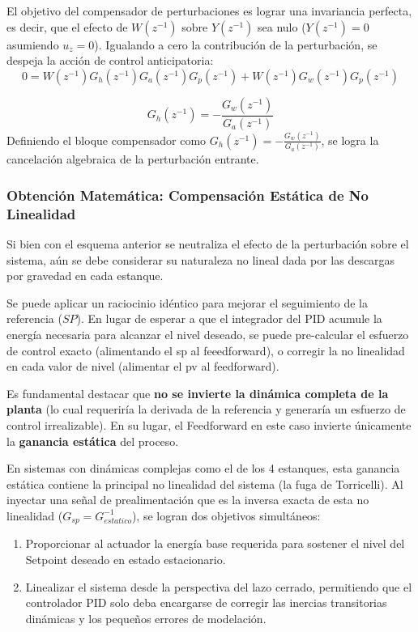 \clearpage


El objetivo del compensador de perturbaciones es lograr una invariancia perfecta, es decir, que el efecto de $W(z^{-1})$ sobre $Y(z^{-1})$ sea nulo ($Y(z^{-1}) = 0$ asumiendo $u_{z}=0$). Igualando a cero la contribución de la perturbación, se despeja la acción de control anticipatoria:
\[
  0 = W(z^{-1})G_h(z^{-1})G_a(z^{-1})G_p(z^{-1}) + W(z^{-1})G_w(z^{-1})G_p(z^{-1}) 
\]

\begin{equation}
  G_h(z^{-1}) = -\frac{G_w(z^{-1})}{G_a(z^{-1})} 
  \label{eq:G_w}
\end{equation}
Definiendo el bloque compensador como $
  G_h(z^{-1}) = -\frac{G_w(z^{-1})}{G_a(z^{-1})} 
$, se logra la cancelación algebraica de la perturbación entrante.

\subsubsection{Obtención Matemática: Compensación Estática de No Linealidad}
Si bien con el esquema anterior se neutraliza el efecto de la perturbación sobre el sistema, aún se debe considerar su naturaleza no lineal dada por las descargas por gravedad en cada estanque.

Se puede aplicar un raciocinio idéntico para mejorar el seguimiento de la referencia ($SP$). En lugar de esperar a que el integrador del PID acumule la energía necesaria para alcanzar el nivel deseado, se puede pre-calcular el esfuerzo de control exacto (alimentando el sp al feeedforward), o corregir la no linealidad en cada valor de nivel (alimentar el pv al feedforward). 

Es fundamental destacar que \textbf{no se invierte la dinámica completa de la planta} (lo cual requeriría la derivada de la referencia y generaría un esfuerzo de control irrealizable). En su lugar, el Feedforward en este caso invierte únicamente la \textbf{ganancia estática} del proceso. 

En sistemas con dinámicas complejas como el de los 4 estanques, esta ganancia estática contiene la principal no linealidad del sistema (la fuga de Torricelli). Al inyectar una señal de prealimentación que es la inversa exacta de esta no linealidad ($G_{sp} = G_{estatico}^{-1}$), se logran dos objetivos simultáneos:

\begin{enumerate}
    \item Proporcionar al actuador la energía base requerida para sostener el nivel del Setpoint deseado en estado estacionario.
    \item Linealizar el sistema desde la perspectiva del lazo cerrado, permitiendo que el controlador PID solo deba encargarse de corregir las inercias transitorias dinámicas y los pequeños errores de modelación.
\end{enumerate}


